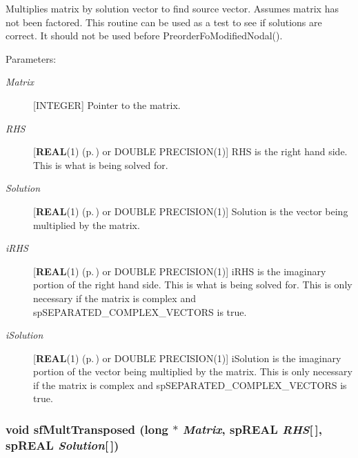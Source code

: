 Multiplies matrix by solution vector to find source vector. Assumes matrix has not been factored. This routine can be used as a test to see if solutions are correct. It should not be used before Preorder\-Fo\-Modified\-Nodal().\begin{Desc}
\item[Parameters: ]\par
\begin{description}
\item[{\em 
Matrix}][INTEGER] Pointer to the matrix. \item[{\em 
RHS}][{\bf REAL}(1) {\rm (p.\,\pageref{spConfig_8h_a0})} or DOUBLE PRECISION(1)] RHS is the right hand side. This is what is being solved for. \item[{\em 
Solution}][{\bf REAL}(1) {\rm (p.\,\pageref{spConfig_8h_a0})} or DOUBLE PRECISION(1)] Solution is the vector being multiplied by the matrix. \item[{\em 
i\-RHS}][{\bf REAL}(1) {\rm (p.\,\pageref{spConfig_8h_a0})} or DOUBLE PRECISION(1)] i\-RHS is the imaginary portion of the right hand side. This is what is being solved for. This is only necessary if the matrix is complex and sp\-SEPARATED\_\-COMPLEX\_\-VECTORS is true. \item[{\em 
i\-Solution}][{\bf REAL}(1) {\rm (p.\,\pageref{spConfig_8h_a0})} or DOUBLE PRECISION(1)] i\-Solution is the imaginary portion of the vector being multiplied by the matrix. This is only necessary if the matrix is complex and sp\-SEPARATED\_\-COMPLEX\_\-VECTORS is true. \end{description}
\end{Desc}
\subsubsection{\setlength{\rightskip}{0pt plus 5cm}void sf\-Mult\-Transposed (long $\ast$ {\em Matrix}, sp\-REAL {\em RHS}[$\,$], sp\-REAL {\em Solution}[$\,$])}\label{spFortran_8c_a73}



